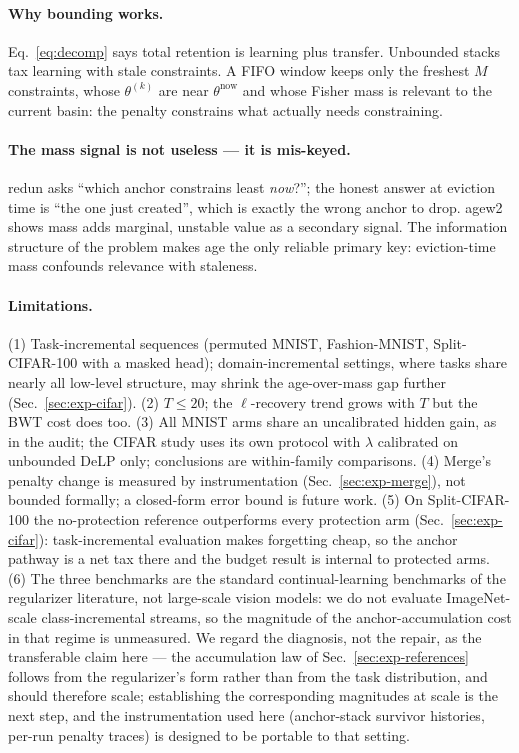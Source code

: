 \documentclass[review,12pt,number]{elsarticle}
\newcommand{\delp}{DeLP}
\begin{document}
\paragraph{Why bounding works.}
Eq.~\ref{eq:decomp} says total retention is learning plus transfer.
Unbounded stacks tax learning with stale constraints. A FIFO window
keeps only the freshest $M$ constraints, whose $\theta^{(k)}$ are
near $\theta^{\text{now}}$ and whose Fisher mass is relevant to the
current basin: the penalty constrains what actually needs
constraining.

\paragraph{The mass signal is not useless --- it is mis-keyed.}
redun asks ``which anchor constrains least \emph{now}?''; the honest
answer at eviction time is ``the one just created'', which is exactly
the wrong anchor to drop. agew2 shows mass adds marginal, unstable
value as a secondary signal. The information structure of the
problem makes age the only reliable primary key: eviction-time mass
confounds relevance with staleness.

\paragraph{Limitations.}
(1) Task-incremental sequences (permuted MNIST, Fashion-MNIST,
Split-CIFAR-100 with a masked head); domain-incremental settings,
where tasks share nearly all low-level structure, may shrink the
age-over-mass gap further (Sec.~\ref{sec:exp-cifar}). (2) $T \le 20$;
the $\ell$-recovery trend grows with $T$ but the BWT cost does too.
(3) All MNIST arms share an uncalibrated hidden gain, as in the audit;
the CIFAR study uses its own protocol with $\lambda$ calibrated on
unbounded \delp{} only; conclusions are within-family comparisons.
(4) Merge's penalty change is measured by instrumentation
(Sec.~\ref{sec:exp-merge}), not bounded formally; a closed-form error
bound is future work. (5) On Split-CIFAR-100 the no-protection reference
outperforms every protection arm
(Sec.~\ref{sec:exp-cifar}): task-incremental evaluation makes
forgetting cheap, so the anchor pathway is a net tax there and the
budget result is internal to protected arms.
(6) The three benchmarks are the standard continual-learning
benchmarks of the regularizer literature, not large-scale vision
models: we do not evaluate ImageNet-scale class-incremental streams, so
the magnitude of the anchor-accumulation cost in that regime is
unmeasured. We regard the diagnosis, not the repair, as the transferable
claim here --- the accumulation law of Sec.~\ref{sec:exp-references}
follows from the regularizer's form rather than from the task
distribution, and should therefore scale; establishing the
corresponding magnitudes at scale is the next step, and the
instrumentation used here (anchor-stack survivor histories, per-run
penalty traces) is designed to be portable to that setting.
\end{document}
